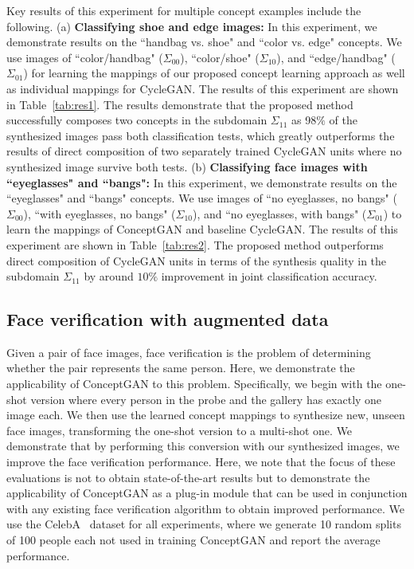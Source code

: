 \documentclass[10pt,twocolumn,letterpaper]{article}
\begin{document}
Key results of this experiment for multiple concept examples include the following. (a) \textbf{Classifying shoe and edge images:} In this experiment, we demonstrate results on the  ``handbag vs. shoe" and ``color vs. edge" concepts. We use images of ``color/handbag" ($\Sigma_{00}$), ``color/shoe" ($\Sigma_{10}$), and ``edge/handbag" ($\Sigma_{01}$) for learning the mappings of our proposed concept learning approach as well as individual mappings for CycleGAN. %
The results of this experiment are shown in Table~\ref{tab:res1}. The results demonstrate that the proposed method successfully composes two concepts in the subdomain $\Sigma_{11}$ as 98$\%$ of the synthesized images pass both classification tests, which greatly outperforms the results of direct composition of two separately trained CycleGAN units where no synthesized image survive both tests. (b) \textbf{Classifying face images with ``eyeglasses" and ``bangs":} In this experiment, we demonstrate results on the ``eyeglasses" and ``bangs" concepts. We use images of ``no eyeglasses, no bangs" ($\Sigma_{00}$), ``with eyeglasses, no bangs" ($\Sigma_{10}$), and ``no eyeglasses, with bangs" ($\Sigma_{01}$) to learn the mappings of ConceptGAN  and baseline CycleGAN. %
The results of this experiment are shown in Table~\ref{tab:res2}. The proposed method outperforms direct composition of CycleGAN units in terms of the synthesis quality in the subdomain $\Sigma_{11}$ by around $10\%$ improvement in joint classification accuracy.


\subsection{Face verification with augmented data}

Given a pair of face images, face verification is the problem of determining whether the pair represents the same person. Here, we demonstrate the applicability of ConceptGAN to this problem. Specifically, we begin with the one-shot version where every person in the probe and the gallery has exactly one image each. We then use the learned concept mappings to synthesize new, unseen face images, transforming the one-shot version to a multi-shot one. We demonstrate that by performing this conversion with our synthesized images, we improve the face verification performance. Here, we note that the focus of these evaluations is not to obtain state-of-the-art results but to demonstrate the applicability of ConceptGAN as a plug-in module that can be used in conjunction with any existing face verification algorithm to obtain improved performance. We use the CelebA~\cite{celebA} dataset for all experiments, where we generate 10 random splits of 100 people each not used in training ConceptGAN and report the average performance. %
\end{document}
